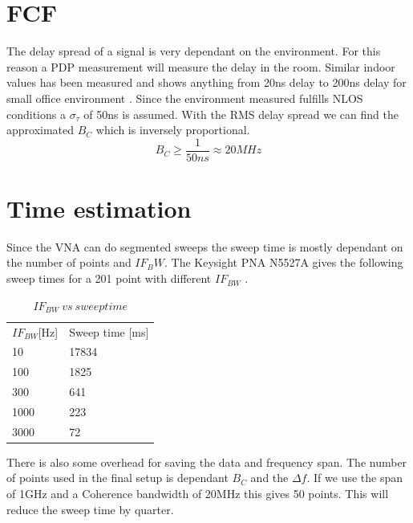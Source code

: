 \section{FCF}
The delay spread of a signal is very dependant on the environment. For this reason a PDP measurement will measure the delay in the room. Similar indoor values has been measured and shows anything from 20ns delay to 200ns delay for small office environment \citep{indoor_delay}. Since the environment measured fulfills NLOS conditions a $\sigma_{\tau}$ of 50ns is assumed. With the RMS delay spread we can find the approximated $B_C$ which is inversely proportional. 
\begin{equation}
B_C \geq \frac{1}{50ns} \approx 20MHz
\label{CohBW}
\end{equation}
\section{Time estimation}
Since the \gls{VNA} can do segmented sweeps the sweep time is mostly dependant on the number of points and $IF_BW$.
The Keysight PNA N5527A gives the following sweep times for a 201 point with different $IF_{BW}$ \citep{Key_PNA}. \\

\begin{table}[H]
\centering
\caption{$IF_{BW} \ vs \ sweep time$}
\label{my-label}
\begin{tabular}{l|l}
\hline
$IF_{BW}${[}Hz{]} & Sweep time {[}ms{]} \\
10              & 17834               \\
100             & 1825                \\
300             & 641                 \\
1000            & 223                 \\
3000            & 72                 
\end{tabular}
\end{table}

There is also some overhead for saving the data and frequency span. The number of points used in the final setup is dependant $B_C$ and the $\Delta f$. If we use the span of 1GHz and a Coherence bandwidth of 20MHz this gives 50 points. This will reduce the sweep time by quarter.

